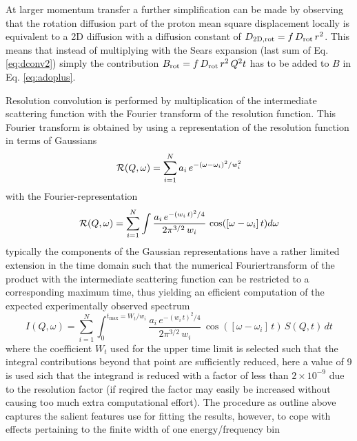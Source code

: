 \documentclass[12pt]{article}
\begin{document}
{{At larger momentum transfer a further simplification can be made by observing that the rotation diffusion
part of the proton mean square displacement locally is equivalent to a 2D diffusion with a diffusion
constant of $D_{\rm 2D,rot} = f\,D_{\rm rot} \, r^2$. This means that instead of multiplying with the
Sears expansion (last sum of Eq. \ref{eq:dconv2}) simply the contribution
$B_{\rm rot} =  f\,D_{\rm rot} \, r^2 \, Q^2 t$ has to be added to $B$ in Eq. \ref{eq:adoplus}.

}}


Resolution convolution is performed by multiplication of the intermediate scattering function with the
Fourier transform of the resolution function. This Fourier transform is obtained by using a representation 
of the resolution function in terms of Gaussians
\begin{equation}
\label{eg:gares}
{\cal R}(Q,\omega) = \sum_{i=1}^{N} { a_i \, e^{-(\omega-\omega_i)^2/w_i^2} }
\end{equation}
with the Fourier-representation
\begin{equation}
\label{eg:garesF}
{\cal R}(Q,\omega) = \sum_{i=1}^{N} {\int \frac{a_i \, e^{-(w_i \, t)^2/4}}{ 2 \pi^{3/2} \, w_i }\, \cos([\omega-\omega_i]\,t) d\omega}
\end{equation}
typically the components of the Gaussian representations have a rather limited extension in
the time domain such that the numerical Fouriertransform of the product with the intermediate
scattering function can be restricted to a corresponding maximum time, thus yielding an 
efficient computation of the expected experimentally observed spectrum
\begin{equation}
\label{eq:conv1}
I(Q,\omega) = \sum_{i=1}^{N} { \int_0^{t_{\max} = W_t/w_i} {
\frac{a_i \, e^{-(w_i \, t)^2/4}}{ 2 \pi^{3/2} \, w_i } \, \cos([\omega-\omega_i]\, t) \, S(Q,t) \, dt 
}}
\end{equation}
where the coefficient $W_t$ used for the upper time limit is selected such that the integral
contributions beyond that point are sufficiently reduced, 
here a value of 9 is used sich that the integrand is reduced with a factor of less than $2 \times 10^{-9}$ 
due to the resolution
factor (if reqired the factor may easily be increased without causing too much extra computational effort). 
The procedure as outline above captures the salient features use for fitting the results,
however, to cope with effects pertaining to the finite width of one energy/frequency bin
\end{document}

